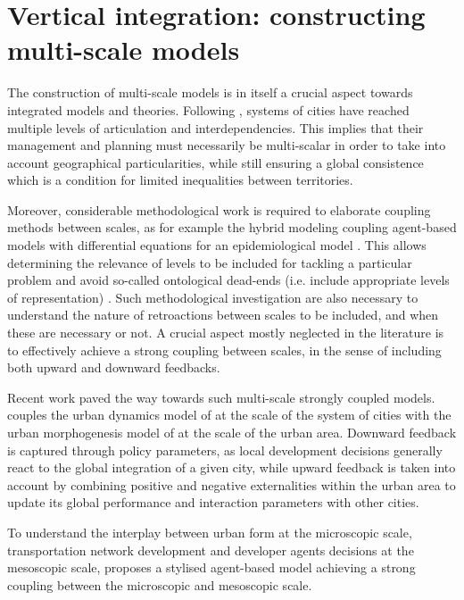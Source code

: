 \section{Vertical integration: constructing multi-scale models}


The construction of multi-scale models is in itself a crucial aspect towards integrated models and theories. Following \cite{rozenblat2018conclusion}, systems of cities have reached multiple levels of articulation and interdependencies. This implies that their management and planning must necessarily be multi-scalar in order to take into account geographical particularities, while still ensuring a global consistence which is a condition for limited inequalities between territories.


Moreover, considerable methodological work is required to elaborate coupling methods between scales, as for example the hybrid modeling coupling agent-based models with differential equations for an epidemiological model \cite{banos2015coupling}. This allows determining the relevance of levels to be included for tackling a particular problem and avoid so-called ontological dead-ends (i.e. include appropriate levels of representation) \cite{roth2006reconstruction}. Such methodological investigation are also necessary to understand the nature of retroactions between scales to be included, and when these are necessary or not. A crucial aspect mostly neglected in the literature is to effectively achieve a strong coupling between scales, in the sense of including both upward and downward feedbacks.

Recent work paved the way towards such multi-scale strongly coupled models. \cite{raimbault2021strong} couples the urban dynamics model of \cite{raimbault2020indirect} at the scale of the system of cities with the urban morphogenesis model of \cite{raimbault2018calibration} at the scale of the urban area. Downward feedback is captured through policy parameters, as local development decisions generally react to the global integration of a given city, while upward feedback is taken into account by combining positive and negative externalities within the urban area to update its global performance and interaction parameters with other cities.

To understand the interplay between urban form at the microscopic scale, transportation network development and developer agents decisions at the mesoscopic scale, \cite{raimbault2021multiscale} proposes a stylised agent-based model achieving a strong coupling between the microscopic and mesoscopic scale.

